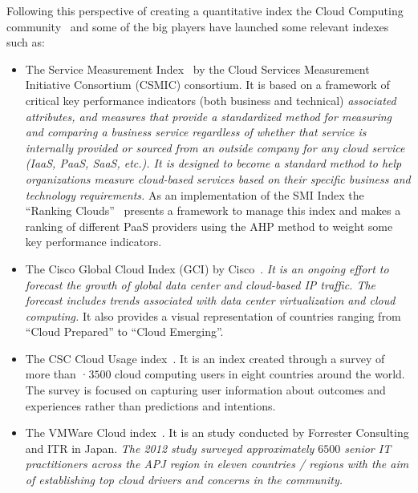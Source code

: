 Following this perspective of creating a quantitative index the Cloud Computing community~\cite{Maiya:2012:QMC:2353730.2353862,DBLP:conf/quatic/KlemsBW12} 
and some of the big players have launched some relevant indexes such as:

\begin{itemize}
 \item The Service Measurement Index~\cite{smi} by the Cloud Services Measurement Initiative Consortium (CSMIC) consortium. It is 
 based on a framework of critical key performance indicators (both business and technical) \textit{associated attributes, and measures 
 that provide a standardized method for measuring and comparing a business service regardless of whether that service is internally provided or sourced from an outside company for any cloud service (IaaS, PaaS, SaaS, etc.). It is designed to become a 
 standard method to help organizations measure cloud-based services based on their specific business and technology requirements.} As 
 an implementation of the SMI Index the ``Ranking Clouds''~\cite{DBLP:journals/fgcs/GargVB13} presents a framework to manage this index 
 and makes a ranking of different PaaS providers using the AHP method to weight some key performance indicators.
 
 \item The Cisco Global Cloud Index (GCI) by Cisco~\cite{cisco}. \textit{It is an ongoing effort to forecast the growth of global data 
 center and cloud-based IP traffic. The forecast includes trends associated with data center virtualization and cloud computing. }
 It also provides a visual representation of countries ranging  from ``Cloud Prepared'' to ``Cloud Emerging''.

 \item The CSC Cloud Usage index~\cite{csc}. It is an index created through a survey of more than ·$3500$ cloud computing users 
 in eight countries around the world. The survey is focused on capturing user information about outcomes and 
 experiences rather than predictions and intentions.

 \item The VMWare Cloud index~\cite{vmware}. It is an study conducted by Forrester Consulting and ITR in Japan. \textit{The 2012 study surveyed 
 approximately $6500$ senior IT practitioners across the APJ region in eleven countries / regions with the aim of establishing 
 top cloud drivers and concerns in the community.}

\end{itemize}

